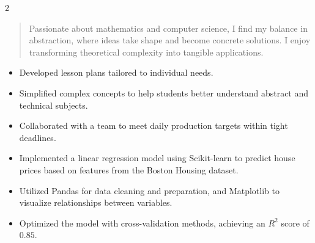 \documentclass[10pt,a4paper,ragged2e,withhyper]{altacv}
\begin{document}
\begin{paracol}{2}


\begin{quote}
\begin{justify}
Passionate about mathematics and computer science, I find my balance in abstraction, where ideas take shape and become concrete solutions. I enjoy transforming theoretical complexity into tangible applications.
\end{justify}
\end{quote}



\begin{itemize}
    \item Developed lesson plans tailored to individual needs.
    \item Simplified complex concepts to help students better understand abstract and technical subjects.
\end{itemize}

\divider

\begin{itemize}
\item Collaborated with a team to meet daily production targets within tight deadlines.
\end{itemize}




\begin{itemize}
    \item Implemented a linear regression model using Scikit-learn to predict house prices based on features from the Boston Housing dataset.
    \item Utilized Pandas for data cleaning and preparation, and Matplotlib to visualize relationships between variables.
    \item Optimized the model with cross-validation methods, achieving an $R^2$ score of $0.85$.
    

\end{itemize}
\end{paracol}
\end{document}
